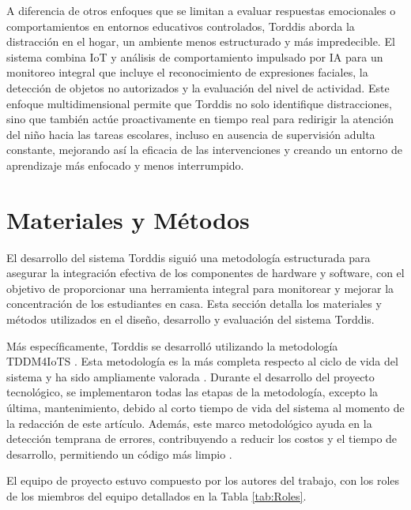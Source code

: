 \documentclass[a4paper,fleqn]{cas-sc}
\begin{document}
	A diferencia de otros enfoques que se limitan a evaluar respuestas emocionales o comportamientos en entornos educativos controlados, Torddis aborda la distracción en el hogar, un ambiente menos estructurado y más impredecible. El sistema combina IoT y análisis de comportamiento impulsado por IA para un monitoreo integral que incluye el reconocimiento de expresiones faciales, la detección de objetos no autorizados y la evaluación del nivel de actividad. Este enfoque multidimensional permite que Torddis no solo identifique distracciones, sino que también actúe proactivamente en tiempo real para redirigir la atención del niño hacia las tareas escolares, incluso en ausencia de supervisión adulta constante, mejorando así la eficacia de las intervenciones y creando un entorno de aprendizaje más enfocado y menos interrumpido.

	
	\section{Materiales y Métodos}
	\label{seccion:Cuatro}
	El desarrollo del sistema Torddis siguió una metodología estructurada para asegurar la integración efectiva de los componentes de hardware y software, con el objetivo de proporcionar una herramienta integral para monitorear y mejorar la concentración de los estudiantes en casa. Esta sección detalla los materiales y métodos utilizados en el diseño, desarrollo y evaluación del sistema Torddis.
	
	Más específicamente, Torddis se desarrolló utilizando la metodología TDDM4IoTS \citep{Guerrero-Ulloa2020TDDM4IoTS}. Esta metodología es la más completa respecto al ciclo de vida del sistema \citep{Guerrero-Ulloa2023Review} y ha sido ampliamente valorada \citep{Guerrero-Ulloa2023DevIdeAir,Guerrero-Ulloa2023IdeAir,Guerrero-Ulloa2023SP4,Guerrero-Ulloa2023Nawi}. Durante el desarrollo del proyecto tecnológico, se implementaron todas las etapas de la metodología, excepto la última, mantenimiento, debido al corto tiempo de vida del sistema al momento de la redacción de este artículo. Además, este marco metodológico ayuda en la detección temprana de errores, contribuyendo a reducir los costos y el tiempo de desarrollo, permitiendo un código más limpio \citep{Beck2002TDD}.
	
	El equipo de proyecto estuvo compuesto por los autores del trabajo, con los roles de los miembros del equipo detallados en la Tabla \ref{tab:Roles}.
	
\end{document}
